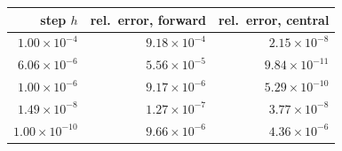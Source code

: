 \begin{tabular}{rrr}
  \toprule
  step $h$ & rel.\ error, forward & rel.\ error, central \\
  \midrule
  $1.00\times 10^{-4}$ & $9.18\times 10^{-4}$ & $2.15\times 10^{-8}$ \\
  $6.06\times 10^{-6}$ & $5.56\times 10^{-5}$ & $9.84\times 10^{-11}$ \\
  $1.00\times 10^{-6}$ & $9.17\times 10^{-6}$ & $5.29\times 10^{-10}$ \\
  $1.49\times 10^{-8}$ & $1.27\times 10^{-7}$ & $3.77\times 10^{-8}$ \\
  $1.00\times 10^{-10}$ & $9.66\times 10^{-6}$ & $4.36\times 10^{-6}$ \\
  \bottomrule
\end{tabular}
